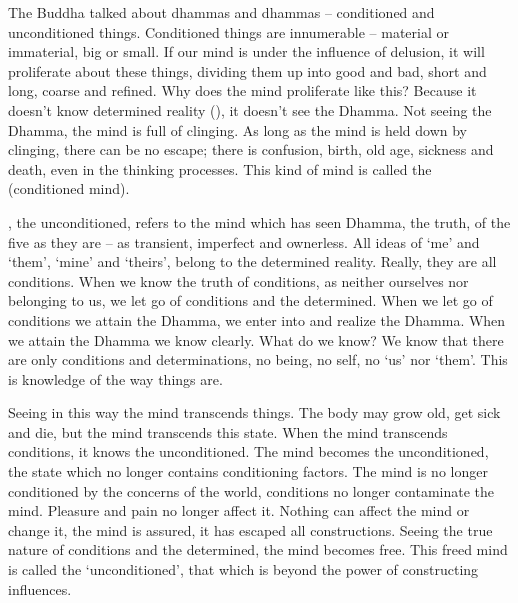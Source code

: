 The Buddha talked about  dhammas and  dhammas -- conditioned and unconditioned things. Conditioned things are innumerable -- material or immaterial, big or small. If our mind is under the influence of delusion, it will proliferate about these things, dividing them up into good and bad, short and long, coarse and refined. Why does the mind proliferate like this? Because it doesn't know determined reality (), it doesn't see the Dhamma. Not seeing the Dhamma, the mind is full of clinging. As long as the mind is held down by clinging, there can be no escape; there is confusion, birth, old age, sickness and death, even in the thinking processes. This kind of mind is called the  (conditioned mind). 

, the unconditioned, refers to the mind which has seen Dhamma, the truth, of the five  as they are -- as transient, imperfect and ownerless. All ideas of `me' and `them', `mine' and `theirs', belong to the determined reality. Really, they are all conditions. When we know the truth of conditions, as neither ourselves nor belonging to us, we let go of conditions and the determined. When we let go of conditions we attain the Dhamma, we enter into and realize the Dhamma. When we attain the Dhamma we know clearly. What do we know? We know that there are only conditions and determinations, no being, no self, no `us' nor `them'. This is knowledge of the way things are. 

Seeing in this way the mind transcends things. The body may grow old, get sick and die, but the mind transcends this state. When the mind transcends conditions, it knows the unconditioned. The mind becomes the unconditioned, the state which no longer contains conditioning factors. The mind is no longer conditioned by the concerns of the world, conditions no longer contaminate the mind. Pleasure and pain no longer affect it. Nothing can affect the mind or change it, the mind is assured, it has escaped all constructions. Seeing the true nature of conditions and the determined, the mind becomes free. This freed mind is called the `unconditioned', that which is beyond the power of constructing influences.

